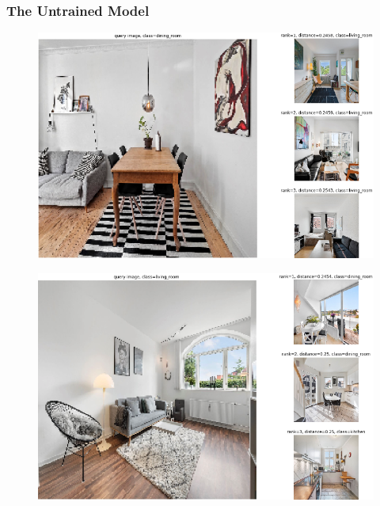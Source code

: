 \subsubsection*{The Untrained Model}
\begin{figure}[H]
    \centering
    \includegraphics[width =\textwidth]{pictures/random/untrainedkitchenplot}
\end{figure}
\begin{figure}[H]
    \centering
    \includegraphics[width =\textwidth]{pictures/random/untrainedlivingroom}
\end{figure}
